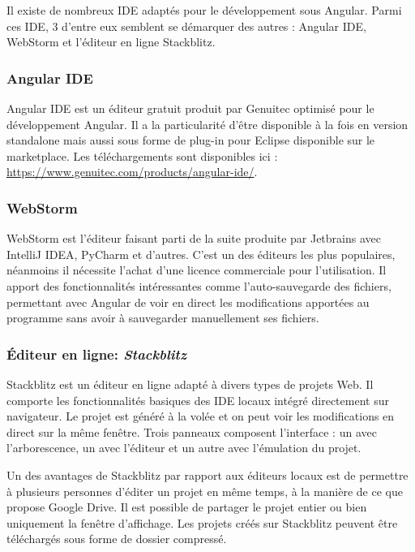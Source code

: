 \documentclass{polytech/polytech}
\begin{document}
Il existe de nombreux IDE adaptés pour le développement sous Angular. Parmi ces IDE, 3 d’entre eux semblent se démarquer des autres : Angular IDE, WebStorm et l’éditeur en ligne Stackblitz.

\subsubsection{Angular IDE}

Angular IDE est un éditeur gratuit produit par Genuitec optimisé pour le développement Angular. Il a la particularité d’être disponible à la fois en version standalone mais aussi sous forme de plug-in pour Eclipse disponible sur le marketplace. Les téléchargements sont disponibles ici : \url{https://www.genuitec.com/products/angular-ide/}. 

\subsubsection{WebStorm}

WebStorm est l’éditeur faisant parti de la suite produite par Jetbrains avec IntelliJ IDEA, PyCharm et d’autres. C’est un des éditeurs les plus populaires, néanmoins il nécessite l’achat d’une licence commerciale pour l’utilisation. Il apport des fonctionnalités intéressantes comme l’auto-sauvegarde des fichiers, permettant avec Angular de voir en direct les modifications apportées au programme sans avoir à sauvegarder manuellement ses fichiers. 

\subsubsection{Éditeur en ligne: \textit{Stackblitz}}

Stackblitz est un éditeur en ligne adapté à divers types de projets Web. Il comporte les fonctionnalités basiques des IDE locaux intégré directement sur navigateur. Le projet est généré à la volée et on peut voir les modifications en direct sur la même fenêtre. Trois panneaux composent l’interface : un avec l’arborescence, un avec l’éditeur et un autre avec l’émulation du projet. 

Un des avantages de Stackblitz par rapport aux éditeurs locaux est de permettre à plusieurs personnes d’éditer un projet en même temps, à la manière de ce que propose Google Drive. Il est possible de partager le projet entier ou bien uniquement la fenêtre d’affichage. Les projets créés sur Stackblitz peuvent être téléchargés sous forme de dossier compressé. 
\end{document}

